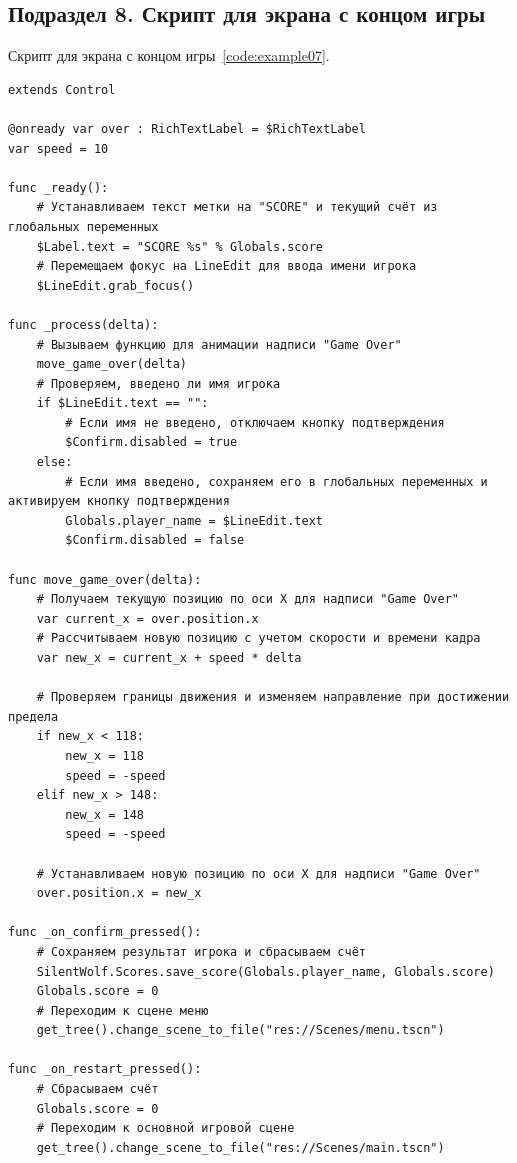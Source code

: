 \subsection{\label{subsec:ch02/sec01/sub08}Подраздел 8. Скрипт для экрана с концом игры}
Скрипт для экрана с концом игры~\ref{code:example07}.
\begin{code}
\vspace{-\baselineskip}\begin{verbatim}
extends Control

@onready var over : RichTextLabel = $RichTextLabel
var speed = 10

func _ready():
    # Устанавливаем текст метки на "SCORE" и текущий счёт из глобальных переменных
    $Label.text = "SCORE %s" % Globals.score
    # Перемещаем фокус на LineEdit для ввода имени игрока
    $LineEdit.grab_focus()

func _process(delta):
    # Вызываем функцию для анимации надписи "Game Over"
    move_game_over(delta)
    # Проверяем, введено ли имя игрока
    if $LineEdit.text == "":
        # Если имя не введено, отключаем кнопку подтверждения
        $Confirm.disabled = true
    else:
        # Если имя введено, сохраняем его в глобальных переменных и активируем кнопку подтверждения
        Globals.player_name = $LineEdit.text
        $Confirm.disabled = false

func move_game_over(delta):
    # Получаем текущую позицию по оси X для надписи "Game Over"
    var current_x = over.position.x
    # Рассчитываем новую позицию с учетом скорости и времени кадра
    var new_x = current_x + speed * delta

    # Проверяем границы движения и изменяем направление при достижении предела
    if new_x < 118:
        new_x = 118
        speed = -speed
    elif new_x > 148:
        new_x = 148
        speed = -speed

    # Устанавливаем новую позицию по оси X для надписи "Game Over"
    over.position.x = new_x

func _on_confirm_pressed():
    # Сохраняем результат игрока и сбрасываем счёт
    SilentWolf.Scores.save_score(Globals.player_name, Globals.score)
    Globals.score = 0
    # Переходим к сцене меню
    get_tree().change_scene_to_file("res://Scenes/menu.tscn")

func _on_restart_pressed():
    # Сбрасываем счёт
    Globals.score = 0
    # Переходим к основной игровой сцене
    get_tree().change_scene_to_file("res://Scenes/main.tscn")


\end{verbatim}
\end{code}

